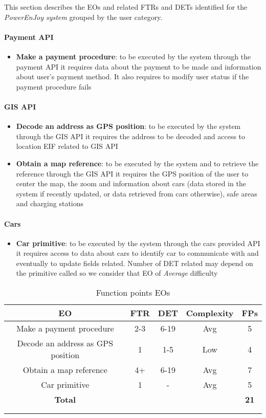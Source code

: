 This section describes the EOs and related FTRs and DETs identified for the \emph{PowerEnJoy system} grouped by the user category.

\paragraph{Payment API}
\begin{itemize}
	\item \textbf{Make a payment procedure}: to be executed by the system through the payment API it requires data about the payment to be made and information about user's payment method. It also requires to modify user status if the payment procedure fails 
\end{itemize}

\paragraph{GIS API}
\begin{itemize}
	\item \textbf{Decode an address as GPS position}: to be executed by the system through the GIS API it requires the address to be decoded and access to location EIF related to GIS API
	\item \textbf{Obtain a map reference}: to be executed by the system and to retrieve the reference through the GIS API it requires the GPS position of the user to center the map, the zoom and information about cars (data stored in the system if recently updated, or data retrieved from cars otherwise), safe areas and charging stations
\end{itemize}

\paragraph{Cars}
\begin{itemize}
	\item \textbf{Car primitive}: to be executed by the system through the cars provided API it requires access to data about cars to identify car to communicate with and eventually to update fields related. Number of DET related may depend on the primitive called so we consider that EO of \emph{Average} difficulty
\end{itemize}


\begin{longtable}{ccccc}
\toprule
\textbf{EO}	& FTR & DET & 	Complexity  & \textbf{FPs}\\
\midrule
Make a payment procedure & 2-3 & 6-19 & Avg & 5\\
Decode an address as GPS position & 1 & 1-5 & Low & 4 \\
Obtain a map reference & 4+ & 6-19 & Avg & 7\\
Car primitive & 1 & - & Avg & 5  \\
\midrule
\textbf{Total} & & & &  \textbf{21}\\
\bottomrule \\
\caption{Function points EOs}
\label{tbl:eoFP}
\end{longtable}


